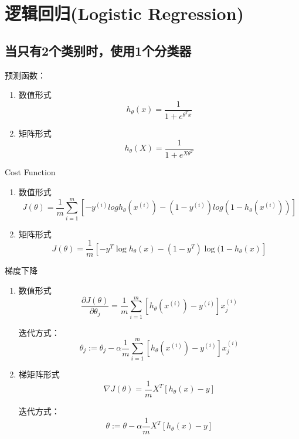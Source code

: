 \section{逻辑回归(Logistic Regression)}

\subsection{当只有2个类别时，使用1个分类器}
预测函数：
\begin{enumerate}
\item 数值形式
\begin{equation}
	h_\theta(x) = \frac{1}{1 + e^{\theta^T x}}
\end{equation}

\item 矩阵形式
\begin{equation}
	h_\theta(X) = \frac{1}{1 + e^{X \theta^T}}
\end{equation}
\end{enumerate}


Cost Function
\begin{enumerate}
\item 数值形式
\begin{equation}
	J(\theta) = \frac{1}{m}
	    \sum_{i=1}^m \left[ -y^{(i)}log{h_\theta(x^{(i)})} - (1-y^{(i)})log{(1-h_\theta(x^{(i)}))} \right]
\end{equation}

\item 矩阵形式
\begin{equation}
		J(\theta) = \frac{1}{m} \left[-y^T \log{h_\theta(x)} - (1-y^T) \log{(1-h_\theta(x)}\right]
\end{equation}
\end{enumerate}



梯度下降
\begin{enumerate}
\item 数值形式
\begin{equation}
	\frac{\partial J(\theta)}{\partial \theta_j} =
	    \frac{1}{m} \sum_{i=1}^m \left[h_\theta(x^{(i)}) - y^{(i)}\right] x_j^{(i)}
\end{equation}

迭代方式：
\begin{equation}
	\theta_j :=
	    \theta_j - \alpha \frac{1}{m} \sum_{i=1}^m \left[h_\theta(x^{(i)}) - y^{(i)}\right] x_j^{(i)}
\end{equation}

\item 梯矩阵形式
\begin{equation}
	\nabla J(\theta) = \frac{1}{m} X^T \left[h_\theta(x) - y\right]
\end{equation}

迭代方式：
\begin{equation}
	\theta := \theta - \alpha \frac{1}{m} X^T \left[h_\theta(x) - y\right]
\end{equation}
\end{enumerate}




